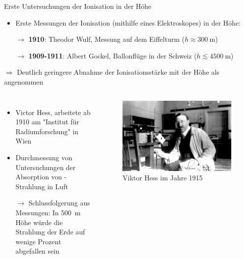 \documentclass[aspectratio=1610, professionalfonts, 9pt, hyperref={colorlinks=false}]{beamer}
\begin{document}
\begin{frame}{Erste Untersuchungen der Ionisation in der Höhe}
      \begin{itemize}
        \setlength\itemsep{0.5em}
        \item Erste Messungen der Ionisation (mithilfe eines Elektroskopes) in der Höhe:
        \item[$\rightarrow$] \textbf{1910}: Theodor Wulf, Messung auf dem Eiffelturm ($h \approx \SI{300}{\metre}$)  
        \item[$\rightarrow$] \textbf{1909-1911}: Albert Gockel, Ballonflüge in der Schweiz ($h \lesssim \SI{4500}{\metre}$)
      \end{itemize}
        \vspace*{10px}

        $\Rightarrow$ Deutlich geringere Abnahme der Ionisationsstärke mit der Höhe als angenommen 
\end{frame}

\begin{frame}{}
  \begin{columns}
      \begin{itemize}
        \setlength\itemsep{0.5em}
        \item Victor Hess, arbeitete ab 1910 am "Institut für Radiumforschung" in Wien
        \item Durchmessung von Untersuchungen der Absorption von \gamma-Strahlung in Luft
        \item [$\rightarrow$] Schlussfolgerung aus Messungen: In \SI{500}{\metre} Höhe würde die Strahlung der Erde auf wenige Prozent abgefallen sein
      \end{itemize}
        \vspace*{10px}
  
      \begin{figure}
          \centering
          \includegraphics[width=\linewidth]{images/X-HESS-2140.jpg}
          \caption{Viktor Hess im Jahre 1915 \cite{hess}}
      \end{figure}
  \end{columns}
\end{frame}
\end{document}
